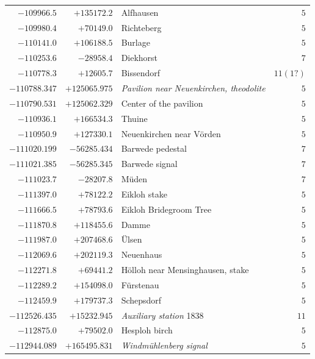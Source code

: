\begin{center}
\begin{tabular}{r|r|p{170pt}|r}
\(-109966.5\)&\(+135172.2\)&Alfhausen&\(5\)\\
\(-109980.4\)&\(+70149.0\)&Richteberg&\(5\)\\
\(-110141.0\)&\(+106188.5\)&Burlage&\(5\)\\
\(-110253.6\)&\(-28958.4\)&Diekhorst&\(7\)\\
\(-110778.3\)&\(+12605.7\)&Bissendorf&\(11(1?)\)\\
\(-110788.347\)&\(+125065.975\)&\textit{Pavilion near Neuenkirchen, theodolite}&\(5\)\\
\(-110790.531\)&\(+125062.329\)&Center of the pavilion&\(5\)\\
\(-110936.1\)&\(+166534.3\)&Thuine&\(5\)\\
\(-110950.9\)&\(+127330.1\)&Neuenkirchen near Vörden&\(5\)\\
\(-111020.199\)&\(-56285.434\)&Barwede pedestal&\(7\)\\
\(-111021.385\)&\(-56285.345\)&Barwede signal&\(7\)\\
\(-111023.7\)&\(-28207.8\)&Müden&\(7\)\\
\(-111397.0\)&\(+78122.2\)&Eikloh stake&\(5\)\\
\(-111666.5\)&\(+78793.6\)&Eikloh Bridegroom Tree&\(5\)\\
\(-111870.8\)&\(+118455.6\)&Damme&\(5\)\\
\(-111987.0\)&\(+207468.6\)&Ülsen&\(5\)\\
\(-112069.6\)&\(+202119.3\)&Neuenhaus&\(5\)\\
\(-112271.8\)&\(+69441.2\)&Hölloh near Mensinghausen, stake&\(5\)\\
\(-112289.2\)&\(+154098.0\)&Fürstenau&\(5\)\\
\(-112459.9\)&\(+179737.3\)&Schepsdorf&\(5\)\\
\(-112526.435\)&\(+15232.945\)&\textit{Auxiliary station} 1838&\(11\)\\
\(-112875.0\)&\(+79502.0\)&Hesploh birch&\(5\)\\
\(-112944.089\)&\(+165495.831\)&\textit{Windmühlenberg signal}&\(5\)\\
\hline\end{tabular}\endgroup\end{center}
